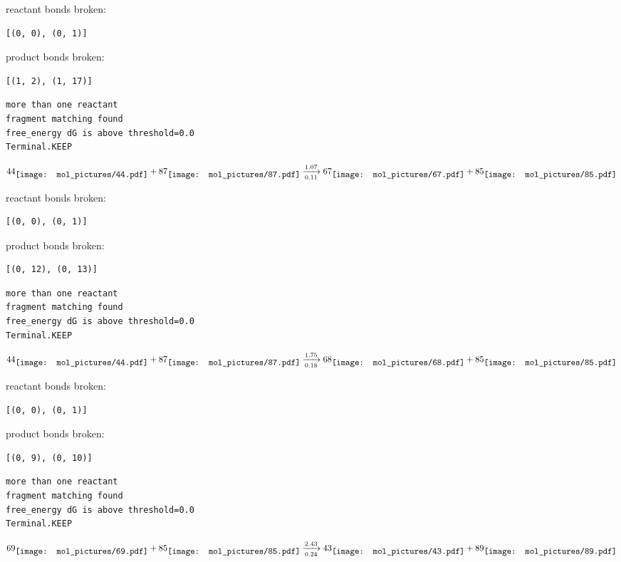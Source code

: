 \documentclass{article}
\begin{document}
reactant bonds broken:\begin{verbatim}
[(0, 0), (0, 1)]
\end{verbatim}
product bonds broken:\begin{verbatim}
[(1, 2), (1, 17)]
\end{verbatim}




\vspace{1cm}
\begin{verbatim}
more than one reactant
fragment matching found
free_energy dG is above threshold=0.0
Terminal.KEEP
\end{verbatim}
$$
44
\raisebox{-.5\height}{\texttt{[image: mol\_pictures/44.pdf]}}
+
87
\raisebox{-.5\height}{\texttt{[image: mol\_pictures/87.pdf]}}
\xrightarrow[0.11]{1.07}
67
\raisebox{-.5\height}{\texttt{[image: mol\_pictures/67.pdf]}}
+
85
\raisebox{-.5\height}{\texttt{[image: mol\_pictures/85.pdf]}}
$$


reactant bonds broken:\begin{verbatim}
[(0, 0), (0, 1)]
\end{verbatim}
product bonds broken:\begin{verbatim}
[(0, 12), (0, 13)]
\end{verbatim}




\vspace{1cm}
\begin{verbatim}
more than one reactant
fragment matching found
free_energy dG is above threshold=0.0
Terminal.KEEP
\end{verbatim}
$$
44
\raisebox{-.5\height}{\texttt{[image: mol\_pictures/44.pdf]}}
+
87
\raisebox{-.5\height}{\texttt{[image: mol\_pictures/87.pdf]}}
\xrightarrow[0.18]{1.75}
68
\raisebox{-.5\height}{\texttt{[image: mol\_pictures/68.pdf]}}
+
85
\raisebox{-.5\height}{\texttt{[image: mol\_pictures/85.pdf]}}
$$


reactant bonds broken:\begin{verbatim}
[(0, 0), (0, 1)]
\end{verbatim}
product bonds broken:\begin{verbatim}
[(0, 9), (0, 10)]
\end{verbatim}




\vspace{1cm}
\begin{verbatim}
more than one reactant
fragment matching found
free_energy dG is above threshold=0.0
Terminal.KEEP
\end{verbatim}
$$
69
\raisebox{-.5\height}{\texttt{[image: mol\_pictures/69.pdf]}}
+
85
\raisebox{-.5\height}{\texttt{[image: mol\_pictures/85.pdf]}}
\xrightarrow[0.24]{2.43}
43
\raisebox{-.5\height}{\texttt{[image: mol\_pictures/43.pdf]}}
+
89
\raisebox{-.5\height}{\texttt{[image: mol\_pictures/89.pdf]}}
$$
\end{document}

